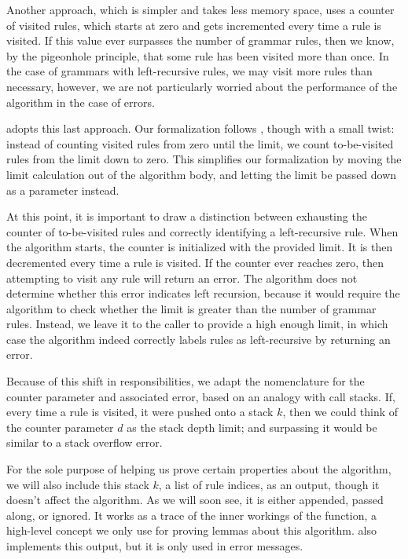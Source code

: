 Another approach,
which is simpler and takes less memory space,
uses a counter of visited rules,
which starts at zero
and gets incremented every time a rule is visited.
If this value ever surpasses the number of grammar rules,
then we know, by the pigeonhole principle,
that some rule has been visited more than once.
In the case of grammars with left-recursive rules,
we may visit more rules than necessary,
however, we are not particularly worried
about the performance of the algorithm
in the case of errors.

\lpeg{} adopts this last approach.
Our formalization follows \lpeg{},
though with a small twist:
instead of counting visited rules from zero until the limit,
we count to-be-visited rules from the limit down to zero.
This simplifies our formalization
by moving the limit calculation out of the algorithm body,
and letting the limit be passed down as a parameter instead.

At this point,
it is important to draw a distinction between
exhausting the counter of to-be-visited rules
and correctly identifying a left-recursive rule.
When the algorithm starts,
the counter is initialized with the provided limit.
It is then decremented every time a rule is visited.
If the counter ever reaches zero,
then attempting to visit any rule
will return an error.
The algorithm does not determine
whether this error indicates left recursion,
because it would require the algorithm to check
whether the limit is greater than the number of grammar rules.
Instead, we leave it to the caller
to provide a high enough limit,
in which case the algorithm indeed
correctly labels rules as left-recursive
by returning an error.

Because of this shift in responsibilities,
we adapt the nomenclature
for the counter parameter and associated error,
based on an analogy with call stacks.
If, every time a rule is visited, it were pushed onto a stack $k$,
then we could think of the counter parameter $d$ as the stack depth limit;
and surpassing it would be similar to a stack overflow error.

For the sole purpose of helping us prove certain properties about the algorithm,
we will also include this stack $k$, a list of rule indices, as an output,
though it doesn't affect the algorithm.
As we will soon see, it is either appended, passed along, or ignored.
It works as a trace of the inner workings of the function,
a high-level concept we only use for proving lemmas about this algorithm.
\lpeg{} also implements this output, but it is only used in error messages.

